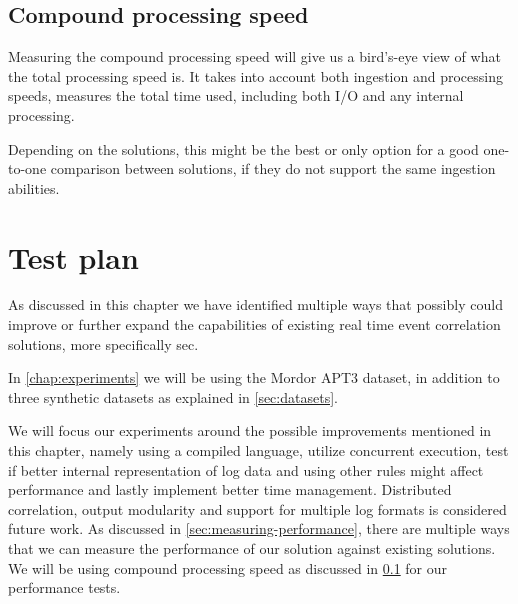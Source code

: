 \subsection{Compound processing speed}
\label{sub:compound-processing-speed}

Measuring the compound processing speed will give us a bird's-eye view of what the total processing speed is. It takes into account both ingestion and processing speeds, measures the total time used, including both I/O and any internal processing.

Depending on the solutions, this might be the best or only option for a good one-to-one comparison between solutions, if they do not support the same ingestion abilities.


\section{Test plan}
As discussed in this chapter we have identified  multiple ways that possibly could improve or further expand the capabilities of existing real time event correlation solutions, more specifically \acrshort{sec}.

In \cref{chap:experiments} we will be using the Mordor \cite{mordor_datasets} APT3 dataset, in addition to three synthetic datasets as explained in \cref{sec:datasets}.

We will focus our experiments around the possible improvements mentioned in this chapter, namely using a compiled language, utilize concurrent execution, test if better internal representation of log data and using other rules might affect performance and lastly implement better time management. Distributed correlation, output modularity and support for multiple log formats is considered future work.
As discussed in \cref{sec:measuring-performance}, there are multiple ways that we can measure the performance of our solution against existing solutions. We will be using compound processing speed as discussed in \cref{sub:compound-processing-speed} for our performance tests.